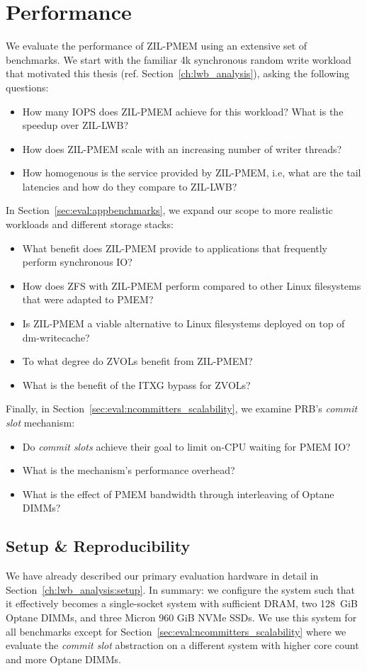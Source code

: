 \documentclass[12pt,a4paper,twoside]{book}
\begin{document}
\clearpage

\section{Performance}

We evaluate the performance of ZIL-PMEM using an extensive set of benchmarks.
We start with the familiar 4k synchronous random write workload that motivated this thesis (ref. Section~\ref{ch:lwb_analysis}), asking the following questions:
\begin{itemize}[noitemsep]
    \item How many IOPS does ZIL-PMEM achieve for this workload? What is the speedup over ZIL-LWB?
    \item How does ZIL-PMEM scale with an increasing number of writer threads?
    \item How homogenous is the service provided by ZIL-PMEM, i.e, what are the tail latencies and how do they compare to ZIL-LWB?
\end{itemize}
In Section~\ref{sec:eval:appbenchmarks}, we expand our scope to more realistic workloads and different storage stacks:
\begin{itemize}[noitemsep]
    \item What benefit does ZIL-PMEM provide to applications that frequently perform synchronous IO?
    \item How does ZFS with ZIL-PMEM perform compared to other Linux filesystems that were adapted to PMEM?
    \item Is ZIL-PMEM a viable alternative to Linux filesystems deployed on top of dm-writecache?
    \item To what degree do ZVOLs benefit from ZIL-PMEM?
    \item What is the benefit of the ITXG bypass for ZVOLs?
\end{itemize}
Finally, in Section~\ref{sec:eval:ncommitters_scalability}, we examine PRB's \textit{commit slot} mechanism:
\begin{itemize}[noitemsep]
    \item Do \textit{commit slots} achieve their goal to limit on-CPU waiting for PMEM IO?
    \item What is the mechanism's performance overhead?
    \item What is the effect of PMEM bandwidth through interleaving of Optane DIMMs?
\end{itemize}

\subsection{Setup \& Reproducibility}
We have already described our primary evaluation hardware in detail in Section~\ref{ch:lwb_analysis:setup}.
In summary: we configure the system such that it effectively becomes a single-socket system with sufficient DRAM, two 128~GiB Optane DIMMs, and three Micron 960 GiB NVMe SSDs.
We use this system for all benchmarks except for Section~\ref{sec:eval:ncommitters_scalability} where we evaluate the \textit{commit slot} abstraction on a different system with higher core count and more Optane DIMMs.
\end{document}
